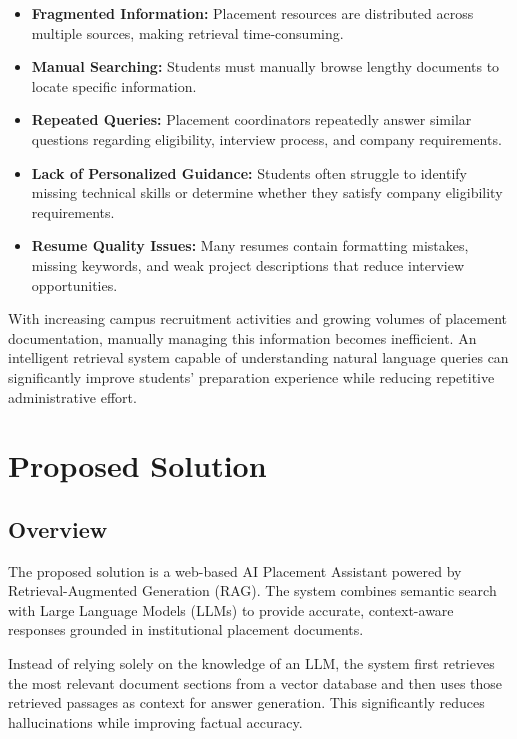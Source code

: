 \documentclass[11pt]{article}
\begin{document}
\begin{itemize}

\item \textbf{Fragmented Information:} Placement resources are distributed across multiple sources, making retrieval time-consuming.

\item \textbf{Manual Searching:} Students must manually browse lengthy documents to locate specific information.

\item \textbf{Repeated Queries:} Placement coordinators repeatedly answer similar questions regarding eligibility, interview process, and company requirements.

\item \textbf{Lack of Personalized Guidance:} Students often struggle to identify missing technical skills or determine whether they satisfy company eligibility requirements.

\item \textbf{Resume Quality Issues:} Many resumes contain formatting mistakes, missing keywords, and weak project descriptions that reduce interview opportunities.

\end{itemize}

With increasing campus recruitment activities and growing volumes of placement documentation, manually managing this information becomes inefficient. An intelligent retrieval system capable of understanding natural language queries can significantly improve students' preparation experience while reducing repetitive administrative effort.

\section{Proposed Solution}

\subsection{Overview}

The proposed solution is a web-based AI Placement Assistant powered by Retrieval-Augmented Generation (RAG). The system combines semantic search with Large Language Models (LLMs) to provide accurate, context-aware responses grounded in institutional placement documents.

Instead of relying solely on the knowledge of an LLM, the system first retrieves the most relevant document sections from a vector database and then uses those retrieved passages as context for answer generation. This significantly reduces hallucinations while improving factual accuracy.
\end{document}

